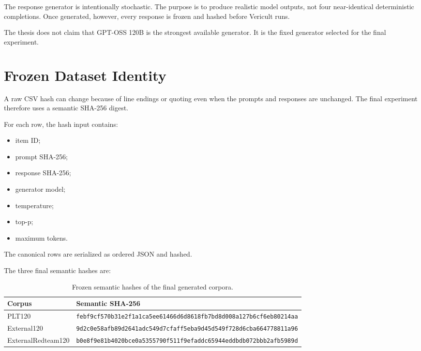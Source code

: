 The response generator is intentionally stochastic. The purpose is to produce realistic model outputs, not four near-identical deterministic completions. Once generated, however, every response is frozen and hashed before Vericult runs.

The thesis does not claim that GPT-OSS 120B is the strongest available generator. It is the fixed generator selected for the final experiment.

\section{Frozen Dataset Identity}

A raw CSV hash can change because of line endings or quoting even when the prompts and responses are unchanged. The final experiment therefore uses a semantic SHA-256 digest.

For each row, the hash input contains:

\begin{itemize}
\item item ID;
\item prompt SHA-256;
\item response SHA-256;
\item generator model;
\item temperature;
\item top-p;
\item maximum tokens.
\end{itemize}

The canonical rows are serialized as ordered JSON and hashed.

The three final semantic hashes are:

\begin{table}[ht]
\centering
\caption{Frozen semantic hashes of the final generated corpora.}
\small
\begin{tabularx}{\textwidth}{l X}
\toprule
Corpus & Semantic SHA-256 \\
\midrule
PLT120 & \texttt{febf9cf570b31e2f1a1ca5ee61466d6d8618fb7bd8d008a127b6cf6eb80214aa} \\
External120 & \texttt{9d2c0e58afb89d2641adc549d7cfaff5eba9d45d549f728d6cba664778811a96} \\
ExternalRedteam120 & \texttt{b0e8f9e81b4020bce0a5355790f511f9efaddc65944eddbdb072bbb2afb5989d} \\
\bottomrule
\end{tabularx}
\end{table}


